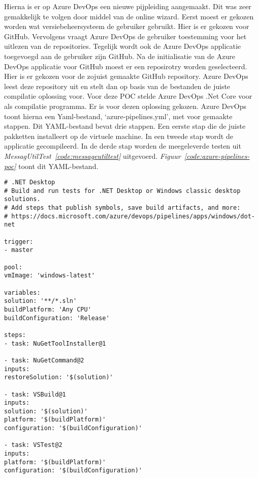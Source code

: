 Hierna is er op Azure DevOps een nieuwe pijpleiding aangemaakt. Dit was zeer gemakkelijk te volgen door middel van de online wizard. Eerst moest er gekozen worden wat versiebeheersysteem de gebruiker gebruikt. Hier is er gekozen voor GitHub. Vervolgens vraagt Azure DevOps de gebruiker toestemming voor het uitlezen van de repositories. Tegelijk wordt ook de Azure DevOps applicatie toegevoegd aan de gebruiker zijn GitHub. Na de initialisatie van de Azure DevOps applicatie voor GitHub moest er een reposirotry worden geselecteerd. Hier is er gekozen voor de zojuist gemaakte GitHub repository. Azure DevOps leest deze repository uit en stelt dan op basis van de bestanden de juiste compilatie oplossing voor. Voor deze POC stelde Azure DevOps .Net Core voor als compilatie programma. Er is voor dezen oplossing gekozen. Azure DevOps toont hierna een Yaml-bestand, ‘azure-pipelines.yml’, met voor gemaakte stappen. Dit YAML-bestand bevat drie stappen. Een eerste stap die de juiste pakketten installeert op de virtuele machine. In een tweede stap wordt de applicatie gecompileerd. In de derde stap worden de meegeleverde testen uit \emph{MessagUtilTest~\ref{code:messageutiltest}} uitgevoerd. \emph{Figuur~\ref{code:azure-pipelines-poc}} toont dit YAML-bestand.

\begin{lstlisting}
# .NET Desktop
# Build and run tests for .NET Desktop or Windows classic desktop solutions.
# Add steps that publish symbols, save build artifacts, and more:
# https://docs.microsoft.com/azure/devops/pipelines/apps/windows/dot-net

trigger:
- master

pool:
vmImage: 'windows-latest'

variables:
solution: '**/*.sln'
buildPlatform: 'Any CPU'
buildConfiguration: 'Release'

steps:
- task: NuGetToolInstaller@1

- task: NuGetCommand@2
inputs:
restoreSolution: '$(solution)'

- task: VSBuild@1
inputs:
solution: '$(solution)'
platform: '$(buildPlatform)'
configuration: '$(buildConfiguration)'

- task: VSTest@2
inputs:
platform: '$(buildPlatform)'
configuration: '$(buildConfiguration)'
\end{lstlisting}

